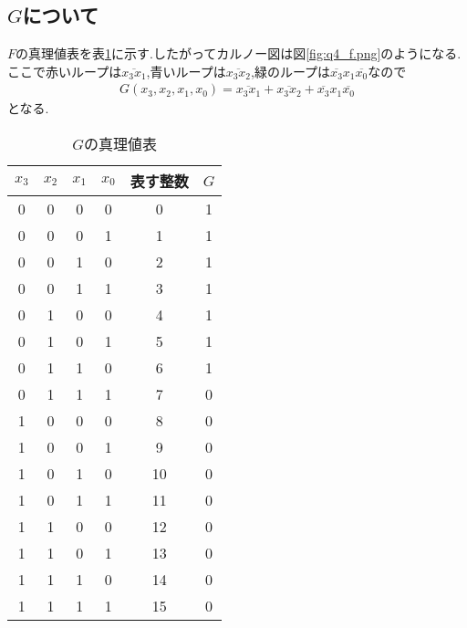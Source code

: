 \subsection{$G$について}
$F$の真理値表を表\ref{tab:q4_g}に示す.したがってカルノー図は図\ref{fig:q4_f.png}のようになる.
ここで赤いループは$\overline{x_3x_1}$,青いループは$\overline{x_3x_2}$,緑のループは$\overline{x_3}x_1\overline{x_0}$なので
\begin{align*}
  G(x_3,x_2,x_1,x_0)=\overline{x_3x_1}+\overline{x_3x_2}+\overline{x_3}x_1\overline{x_0}
\end{align*}
となる.
\begin{table}[h]
\caption{$G$の真理値表}
\label{tab:q4_g}
\centering
\begin{tabular}{cccccc}
\hline
$x_3$&$x_2$&$x_1$&$x_0$&表す整数&$G$\\
\hline \hline
0 & 0 & 0 & 0 & 0 & 1 \\
0 & 0 & 0 & 1 & 1 & 1 \\
0 & 0 & 1 & 0 & 2 & 1 \\
0 & 0 & 1 & 1 & 3 & 1 \\
0 & 1 & 0 & 0 & 4 & 1 \\
0 & 1 & 0 & 1 & 5 & 1 \\
0 & 1 & 1 & 0 & 6 & 1 \\
0 & 1 & 1 & 1 & 7 & 0 \\
1 & 0 & 0 & 0 & 8 & 0 \\
1 & 0 & 0 & 1 & 9 & 0 \\
1 & 0 & 1 & 0 & 10 & 0 \\
1 & 0 & 1 & 1 & 11 & 0 \\
1 & 1 & 0 & 0 & 12 & 0 \\
1 & 1 & 0 & 1 & 13 & 0 \\
1 & 1 & 1 & 0 & 14 & 0 \\
1 & 1 & 1 & 1 & 15 & 0 \\
\hline
\end{tabular}
\end{table}
